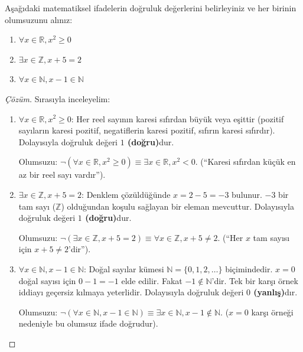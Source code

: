\begin{example}
Aşağıdaki matematiksel ifadelerin doğruluk değerlerini belirleyiniz ve her birinin olumsuzunu alınız:
\begin{enumerate}
  \item $\forall x \in \mathbb{R}, x^2 \ge 0$
  \item $\exists x \in \mathbb{Z}, x + 5 = 2$
  \item $\forall x \in \mathbb{N}, x - 1 \in \mathbb{N}$
\end{enumerate}
\end{example}
\begin{proof}[Çözüm]
Sırasıyla inceleyelim:
\begin{enumerate}
  \item $\forall x \in \mathbb{R}, x^2 \ge 0$:
  Her reel sayının karesi sıfırdan büyük veya eşittir (pozitif sayıların karesi pozitif, negatiflerin karesi pozitif, sıfırın karesi sıfırdır). Dolayısıyla doğruluk değeri \textbf{$1$ (doğru)}dur.
  
  Olumsuzu: $\neg (\forall x \in \mathbb{R}, x^2 \ge 0) \equiv \exists x \in \mathbb{R}, x^2 < 0$. 
  (``Karesi sıfırdan küçük en az bir reel sayı vardır'').

  \item $\exists x \in \mathbb{Z}, x + 5 = 2$:
  Denklem çözüldüğünde $x = 2 - 5 = -3$ bulunur. $-3$ bir tam sayı ($\mathbb{Z}$) olduğundan koşulu sağlayan bir eleman mevcuttur. Dolayısıyla doğruluk değeri \textbf{$1$ (doğru)}dur.
  
  Olumsuzu: $\neg (\exists x \in \mathbb{Z}, x + 5 = 2) \equiv \forall x \in \mathbb{Z}, x + 5 \neq 2$.
  (``Her $x$ tam sayısı için $x + 5 \neq 2$'dir'').

  \item $\forall x \in \mathbb{N}, x - 1 \in \mathbb{N}$:
  Doğal sayılar kümesi $\mathbb{N} = \{0, 1, 2, \dots\}$ biçimindedir. $x = 0$ doğal sayısı için $0 - 1 = -1$ elde edilir. Fakat $-1 \notin \mathbb{N}$'dir. Tek bir karşı örnek iddiayı geçersiz kılmaya yeterlidir. Dolayısıyla doğruluk değeri \textbf{$0$ (yanlış)}dır.
  
  Olumsuzu: $\neg (\forall x \in \mathbb{N}, x - 1 \in \mathbb{N}) \equiv \exists x \in \mathbb{N}, x - 1 \notin \mathbb{N}$.
  ($x = 0$ karşı örneği nedeniyle bu olumsuz ifade doğrudur).
\end{enumerate}
\end{proof}

